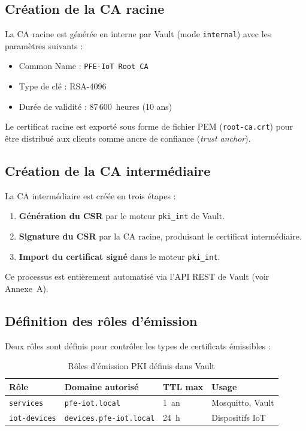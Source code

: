 \subsection{Création de la CA racine}

La CA racine est générée en interne par Vault (mode \texttt{internal}) avec les paramètres suivants :
\begin{itemize}
  \item Common Name : \texttt{PFE-IoT Root CA}
  \item Type de clé : RSA-4096
  \item Durée de validité : 87\,600~heures (10 ans)
\end{itemize}

Le certificat racine est exporté sous forme de fichier PEM (\texttt{root-ca.crt}) pour être distribué aux clients comme ancre de confiance (\textit{trust anchor}).

\subsection{Création de la CA intermédiaire}

La CA intermédiaire est créée en trois étapes :
\begin{enumerate}
  \item \textbf{Génération du CSR} par le moteur \texttt{pki\_int} de Vault.
  \item \textbf{Signature du CSR} par la CA racine, produisant le certificat intermédiaire.
  \item \textbf{Import du certificat signé} dans le moteur \texttt{pki\_int}.
\end{enumerate}

Ce processus est entièrement automatisé via l'API REST de Vault (voir Annexe~A).

\subsection{Définition des rôles d'émission}

Deux rôles sont définis pour contrôler les types de certificats émissibles :

\begin{table}[H]
\centering
\caption{Rôles d'émission PKI définis dans Vault}
\label{tab:vault_roles}
\begin{tabular}{llll}
\toprule
\textbf{Rôle} & \textbf{Domaine autorisé} & \textbf{TTL max} & \textbf{Usage} \\
\midrule
\texttt{services} & \texttt{pfe-iot.local} & 1~an & Mosquitto, Vault \\
\texttt{iot-devices} & \texttt{devices.pfe-iot.local} & 24~h & Dispositifs IoT \\
\bottomrule
\end{tabular}
\end{table}


